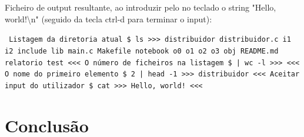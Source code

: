 \documentclass[12pt]{report}
\begin{document}
\noindent Ficheiro de output resultante, ao introduzir pelo no teclado o string "Hello, world!\textbackslash n" (seguido da tecla ctrl-d para terminar o input):

\begin{small}
\fontsize{10}{12}\selectfont
\texttt{
\newline Listagem da diretoria atual
\newline \$ ls
\newline >>>
\newline distribuidor \newline distribuidor.c \newline i1 \newline i2
\newline include \newline lib \newline main.c \newline Makefile
\newline notebook \newline o0 \newline o1 \newline o2 \newline o3
\newline obj \newline README.md \newline relatorio \newline test
\newline <<<
\newline O número de ficheiros na listagem
\newline \$ | wc -l
\newline >>>
\newline <<<
\newline O nome do primeiro elemento
\newline \$ 2 | head -1
\newline >>>
\newline distribuidor
\newline <<<
\newline Aceitar input do utilizador
\newline \$ cat
\newline >>>
\newline Hello, world!
\newline <<<
\newline
}
\end{small}

\chapter{Conclusão}
\label{sec:conclusao}
\end{document}
